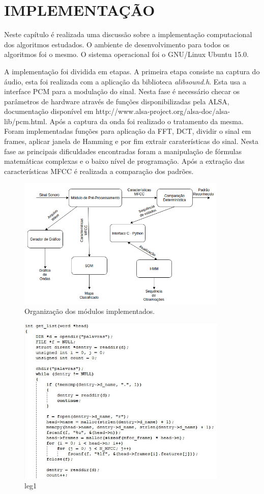 \chapter{IMPLEMENTAÇÃO}
\quad Neste capítulo é realizada uma discussão sobre a implementação computacional dos algoritmos estudados. O ambiente de desenvolvimento para todos os algoritmos foi o mesmo. O sistema operacional foi o GNU/Linux Ubuntu 15.0.

\quad A implementação foi dividida em etapas. A primeira etapa consiste na captura do áudio, esta foi realizada com a aplicação da biblioteca \textit{alibsound.h}. Esta usa a interface PCM para a modulação do sinal. Nesta fase é necessário checar os parâmetros de hardware através de funções disponibilizadas pela ALSA, documentação disponível em http://www.alsa-project.org/alsa-doc/alsa-lib/pcm.html. Após a captura da onda foi realizado o tratamento da mesma. Foram implementadas funções para aplicação da FFT, DCT, dividir o sinal em frames, aplicar janela de Hamming e por fim extrair caraterísticas do sinal. Nesta fase as principais dificuldades encontradas foram a manipulação de fórmulas matemáticas complexas e o baixo nível de programação. Após a extração das características MFCC é realizada a comparação dos padrões.

\begin{figure}[H]
\centering %
\includegraphics[width=10cm]{img/diaraizatcc.png} %
\caption{Organização dos módulos implementados.}
\label{fig:diatcc}
\end{figure}


\begin{figure}[H]
\centering %
\includegraphics[width=10cm]{img/getlist.jpg} %
\caption{leg1}
\label{fig:getlist}
\end{figure}

